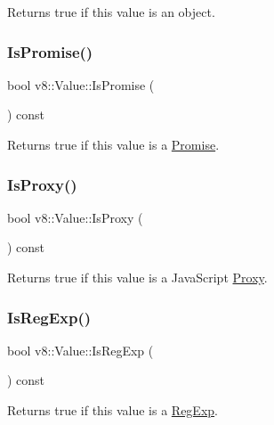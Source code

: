 Returns true if this value is an object. \mbox{\label{classv8_1_1Value_a4b0be5d9dc3a857fee9ba7dac07123e3}} 
\subsubsection{\texorpdfstring{Is\+Promise()}{IsPromise()}}
{\footnotesize\ttfamily bool v8\+::\+Value\+::\+Is\+Promise (\begin{DoxyParamCaption}{ }\end{DoxyParamCaption}) const}

Returns true if this value is a \mbox{\hyperlink{classv8_1_1Promise}{Promise}}. \mbox{\label{classv8_1_1Value_a3c0ad01f2ca4ac050ef8214785848918}} 
\subsubsection{\texorpdfstring{Is\+Proxy()}{IsProxy()}}
{\footnotesize\ttfamily bool v8\+::\+Value\+::\+Is\+Proxy (\begin{DoxyParamCaption}{ }\end{DoxyParamCaption}) const}

Returns true if this value is a Java\+Script \mbox{\hyperlink{classv8_1_1Proxy}{Proxy}}. \mbox{\label{classv8_1_1Value_a010aa78e7cc8e1dbb878479e534992b3}} 
\subsubsection{\texorpdfstring{Is\+Reg\+Exp()}{IsRegExp()}}
{\footnotesize\ttfamily bool v8\+::\+Value\+::\+Is\+Reg\+Exp (\begin{DoxyParamCaption}{ }\end{DoxyParamCaption}) const}

Returns true if this value is a \mbox{\hyperlink{classv8_1_1RegExp}{Reg\+Exp}}. \mbox{\label{classv8_1_1Value_a131fc14572f31efd8e2969963564abbb}} 
